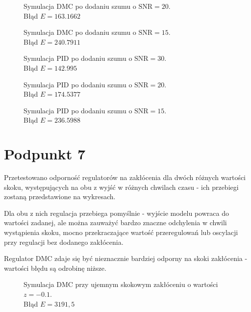 \begin{figure}[ht]
\centering

\caption{Symulacja DMC po dodaniu szumu o $ \mathrm{SNR}=20 $.\\Błąd $ E = \num{163,1662} $}
\label{Z6b}
\end{figure}

\begin{figure}[ht]
\centering

\caption{Symulacja DMC po dodaniu szumu o $ \mathrm{SNR}=15 $.\\Błąd $ E = \num{240,7911} $}
\label{Z6c}
\end{figure}

\begin{figure}[ht]
\centering

\caption{Symulacja PID po dodaniu szumu o $ \mathrm{SNR}=30 $.\\Błąd $ E = \num{142,995} $}
\label{Z6d}
\end{figure}

\begin{figure}[ht]
\centering

\caption{Symulacja PID po dodaniu szumu o $ \mathrm{SNR}=20 $.\\Błąd $ E = \num{174,5377} $}
\label{Z6e}
\end{figure}

\begin{figure}[ht]
\centering

\caption{Symulacja PID po dodaniu szumu o $ \mathrm{SNR}=15 $.\\Błąd $ E = \num{236,5988} $}
\label{Z6f}
\end{figure}

\chapter{Podpunkt 7}
Przetestowano odporność regulatorów na zakłócenia dla dwóch różnych wartości skoku, występujących na obu z wyjść w różnych chwilach czasu - ich przebiegi zostaną przedstawione na wykresach.

Dla obu z nich regulacja przebiega pomyślnie - wyjście modelu powraca do wartości zadanej, ale można zauważyć bardzo znaczne odchylenia w chwili wystąpienia skoku, mocno przekraczające wartość przeregulowań lub oscylacji przy regulacji bez dodanego zakłócenia. 

Regulator DMC zdaje się być nieznacznie bardziej odporny na skoki zakłócenia - wartości błędu są odrobinę niższe.

\begin{figure}[ht]
\centering

\caption{Symulacja DMC przy ujemnym skokowym zakłóceniu o wartości $ z=\num{-0,1}$.\\Błąd $ E=3191,5 $ }
\label{Z6a}
\end{figure}

